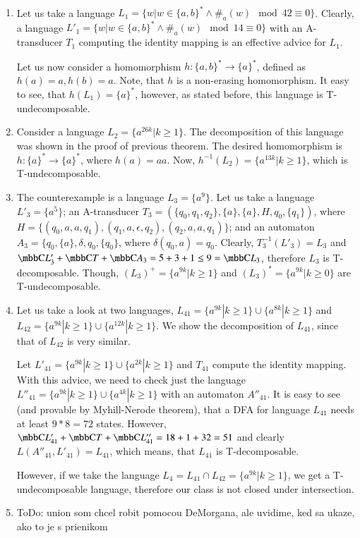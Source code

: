 \paragraph{}
\dokaz
\begin{enumerate}
\item Let us take a language $L_1 = \{w|w \in \{ a,b\}^* \wedge \#_{a}(w) \mod 42 \equiv 0 \}$. Clearly, a language $L'_1 = \{w|w \in \{ a,b\}^* \wedge \#_{a}(w) \mod 14 \equiv 0 \}$ with an A-transducer $T_1$ computing the identity mapping is an effective advice for $L_1$.

Let us now consider a homomorphism $h: \{ a,b\}^* \to \{ a \}^*$, defined as $h(a) = a, h(b) = a$. Note, that $h$ is a non-erasing homomorphism. It easy to see, that $h(L_1) = \{ a \}^*$, however, as stated before, this language is T-undecomposable.

\item Consider a language $L_2 = \{ a^{26k} | k \geq 1 \}$. The decomposition of this language was shown in the proof of previous theorem. The desired homomorphism is $h: \{a\}^* \to \{a\}^*$, where $h(a) = aa$. Now, $h^{-1}(L_2) = \{ a^{13k} | k \geq 1 \}$, which is T-undecomposable.

\item
The counterexample is a language $L_3 = \{ a^{9} \}$. Let us take a language $L'_3 = \{ a^{5} \}$; an A-transducer $T_3 = (\{q_0, q_1, q_2\}, \{a\}, \{a\}, H, q_0, \{q_1\})$, where $H = \{ (q_0, a, a, q_1), (q_1, a, \epsilon, q_2), (q_2, a, a, q_1) \}$; and an automaton $A_3 = \{q_0, \{a\}, \delta, q_0, \{q_0\} $, where $\delta(q_0, a) = q_0$. Clearly, $T_3^{-1}(L'_3) = L_3$ and $\C{L'_3} + \C{T} + \C{A_3} = 5 + 3 + 1 \leq 9 = \C{L_3}$, therefore $L_3$ is T-decomposable. Though, $(L_3)^+ = \{ a^{9k} | k \geq 1 \}$ and $(L_3)^* = \{ a^{9k} | k \geq 0 \}$ are T-undecomposable.

\item Let us take a look at two languages, $L_{41} = \{ a^{9k} | k \geq 1 \} \cup \{ a^{8k} | k \geq 1 \}$ and $L_{42} = \{ a^{9k} | k \geq 1 \} \cup \{ a^{12k} | k \geq 1 \}$. We show the decomposition of $L_{41}$, since that of $L_{42}$ is very similar.

Let $L'_{41} = \{ a^{9k} | k \geq 1 \} \cup \{ a^{2k} | k \geq 1 \}$ and $T_{41}$ compute the identity mapping. With this advice, we need to check just the language $L''_{41} = \{ a^{9k} | k \geq 1 \} \cup \{ a^{4k} | k \geq 1 \}$ with an automaton $A''_{41}$. It is easy to see (and provable by Myhill-Nerode theorem), that a DFA for language $L_{41}$ needs at least $9*8 = 72$ states. However, $\C{L'_{41}} + \C{T} + \C{L''_{41}} = 18 + 1 + 32 = 51$ and clearly $L(A''_{41}, L'_{41}) = L_{41}$, which means, that $L_{41}$ is T-decomposable.

However, if we take the language $L_4 = L_{41} \cap L_{42} = \{ a^{9k} | k \geq 1 \}$, we get a T-undecomposable language, therefore our class is not closed under intersection.

\item \color{red}ToDo: union som chcel robit pomocou DeMorgana, ale uvidime, ked sa ukaze, ako to je s prienikom\color{black}
\end{enumerate}
\square

